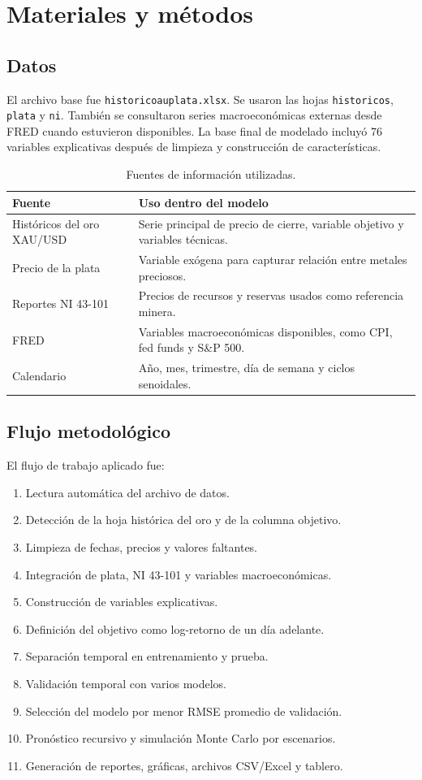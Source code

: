 \documentclass[12pt,letterpaper]{article}
\begin{document}
\section{Materiales y métodos}
\subsection{Datos}
El archivo base fue \texttt{historicoauplata.xlsx}. Se usaron las hojas \texttt{historicos}, \texttt{plata} y \texttt{ni}. También se consultaron series macroeconómicas externas desde FRED cuando estuvieron disponibles. La base final de modelado incluyó 76 variables explicativas después de limpieza y construcción de características.

\begin{table}[H]
\centering
\caption{Fuentes de información utilizadas.}
\begin{tabular}{lp{9cm}}
\toprule
Fuente & Uso dentro del modelo \\
\midrule
Históricos del oro XAU/USD & Serie principal de precio de cierre, variable objetivo y variables técnicas. \\
Precio de la plata & Variable exógena para capturar relación entre metales preciosos. \\
Reportes NI 43-101 & Precios de recursos y reservas usados como referencia minera. \\
FRED & Variables macroeconómicas disponibles, como CPI, fed funds y S\&P 500. \\
Calendario & Año, mes, trimestre, día de semana y ciclos senoidales. \\
\bottomrule
\end{tabular}
\end{table}

\subsection{Flujo metodológico}
El flujo de trabajo aplicado fue:
\begin{enumerate}
    \item Lectura automática del archivo de datos.
    \item Detección de la hoja histórica del oro y de la columna objetivo.
    \item Limpieza de fechas, precios y valores faltantes.
    \item Integración de plata, NI 43-101 y variables macroeconómicas.
    \item Construcción de variables explicativas.
    \item Definición del objetivo como log-retorno de un día adelante.
    \item Separación temporal en entrenamiento y prueba.
    \item Validación temporal con varios modelos.
    \item Selección del modelo por menor RMSE promedio de validación.
    \item Pronóstico recursivo y simulación Monte Carlo por escenarios.
    \item Generación de reportes, gráficas, archivos CSV/Excel y tablero.
\end{enumerate}
\end{document}
